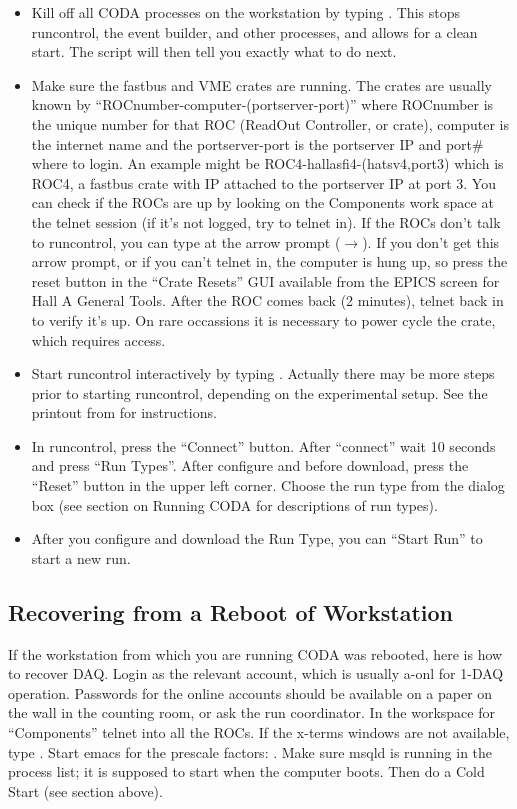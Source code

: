 {\begin{itemize}
\item{Kill off all CODA processes on the workstation
by typing .  This stops runcontrol, the
event builder, and other processes, and allows
for a clean start.  The  script will then
tell you exactly what to do next.}
\item{Make sure the fastbus and VME crates are
running.  The crates are usually known by 
``ROCnumber-computer-(portserver-port)''
where ROCnumber is the unique number for that
ROC (ReadOut Controller, or crate),
computer is the internet name and the 
portserver-port is the portserver IP and port\#
where to login.
An example might be \hskip 0.05in
ROC4-hallasfi4-(hatsv4,port3) which is
ROC4, a fastbus crate with IP  attached
to the portserver IP  at port 3.
You can check if the ROCs
are up by looking on the Components work space
at the telnet session (if it's not logged, 
try to telnet in).
If the ROCs don't talk to runcontrol, you can type
 at the arrow prompt ($\rightarrow$).   If you
don't get this arrow prompt, or if you can't telnet in,
the computer is hung up, so press 
the reset button in the ``Crate Resets'' GUI
available from the EPICS screen for
Hall A General Tools.
After the ROC comes back (2 minutes),
telnet back in to verify it's up.
On rare occassions it is necessary to
power cycle the crate, which requires access. }
\item{ Start runcontrol interactively
by typing .
Actually there may be
more steps prior to starting runcontrol,
depending on the experimental setup.
See the printout from  for instructions.}
\item{ In runcontrol,
press the ``Connect'' button.  
After ``connect''
wait 10 seconds and press ``Run Types''.  
After configure and before download, 
press the ``Reset'' button in the upper left corner.
Choose the run type from the dialog box
(see section on Running
CODA for descriptions of run types).}
\item{ After you configure and download the Run Type,
you can ``Start Run'' to start a new run.}


\end{itemize}


\subsection{ Recovering from a Reboot of Workstation}

If the workstation from which you are running CODA
was rebooted, here is how to recover DAQ.
Login as the relevant account, which is usually
a-onl for 1-DAQ operation. Passwords for the online
accounts should be available on a paper on the wall
in the counting room, or ask the run coordinator.
In the workspace for ``Components'' telnet into
all the ROCs.  If the x-terms windows are not 
available, type .  Start emacs
for the prescale factors: 
.
Make sure msqld is running in the process list;
it is supposed to start when the computer boots.
Then do a Cold Start (see section above).

}

